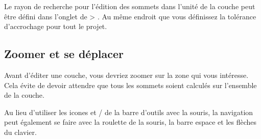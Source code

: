 Le rayon de recherche pour l'édition des sommets dans l'unité de la couche peut 
être défini dans l'onglet  de  > 
. Au même endroit que vous définissez 
la tolérance d'accrochage pour tout le projet.

\subsection{Zoomer et se déplacer}


Avant d'éditer une couche, vous devriez zoomer sur la zone qui vous intéresse. Cela évite de devoir attendre que tous les sommets soient calculés sur l'ensemble de la couche.


Au lieu d'utiliser les icones  et / de la barre d'outils avec la souris, la navigation peut également se faire avec la roulette de la souris, la barre espace et les flèches du clavier.



